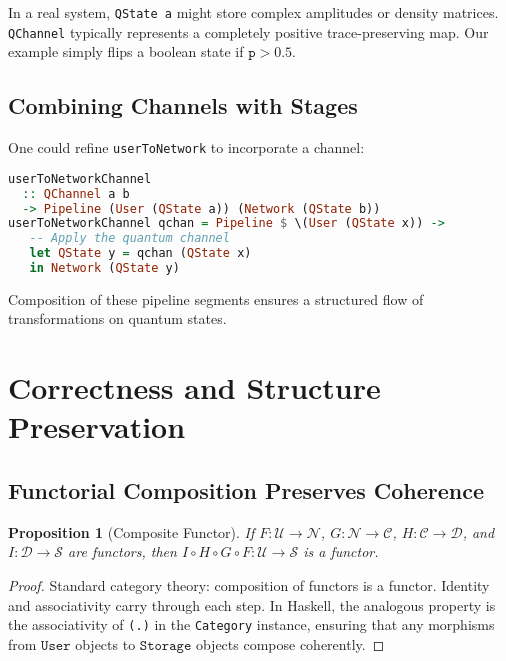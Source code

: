 \documentclass[12pt]{article}
\newtheorem{proposition}[theorem]{Proposition}
\begin{document}
In a real system, \texttt{QState a} might store complex amplitudes
or density matrices. \texttt{QChannel} typically represents a
completely positive trace-preserving map. Our example simply flips
a boolean state if \(\texttt{p} > 0.5\).

\subsection{Combining Channels with Stages}

One could refine \texttt{userToNetwork} to incorporate a channel:

\begin{lstlisting}[language=Haskell,caption={Refined userToNetwork with a quantum channel.},float]
userToNetworkChannel
  :: QChannel a b
  -> Pipeline (User (QState a)) (Network (QState b))
userToNetworkChannel qchan = Pipeline $ \(User (QState x)) ->
   -- Apply the quantum channel
   let QState y = qchan (QState x)
   in Network (QState y)
\end{lstlisting}

Composition of these pipeline segments ensures a structured flow
of transformations on quantum states.

\section{Correctness and Structure Preservation}

\subsection{Functorial Composition Preserves Coherence}

\begin{proposition}[Composite Functor]
If \(F: \mathcal{U} \to \mathcal{N}\), \(G: \mathcal{N} \to \mathcal{C}\),
\(H: \mathcal{C} \to \mathcal{D}\), and \(I: \mathcal{D} \to \mathcal{S}\)
are functors, then \(I \circ H \circ G \circ F: \mathcal{U} \to \mathcal{S}\)
is a functor.
\end{proposition}

\begin{proof}
Standard category theory: composition of functors is a functor.
Identity and associativity carry through each step. In Haskell,
the analogous property is the associativity of \texttt{(.)} in
the \texttt{Category} instance, ensuring that any morphisms from
\(\texttt{User}\) objects to \(\texttt{Storage}\) objects compose
coherently.
\end{proof}
\end{document}
